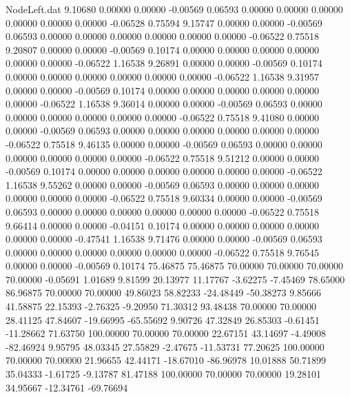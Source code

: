 \begin{filecontents}{NodeLeft.dat}
   9.10680    0.00000    0.00000    -0.00569    0.06593    0.00000    0.00000    0.00000    0.00000    0.00000    0.00000   -0.06528    0.75594
   9.15747    0.00000    0.00000    -0.00569    0.06593    0.00000    0.00000    0.00000    0.00000    0.00000    0.00000   -0.06522    0.75518
   9.20807    0.00000    0.00000    -0.00569    0.10174    0.00000    0.00000    0.00000    0.00000    0.00000    0.00000   -0.06522    1.16538
   9.26891    0.00000    0.00000    -0.00569    0.10174    0.00000    0.00000    0.00000    0.00000    0.00000    0.00000   -0.06522    1.16538
   9.31957    0.00000    0.00000    -0.00569    0.10174    0.00000    0.00000    0.00000    0.00000    0.00000    0.00000   -0.06522    1.16538
   9.36014    0.00000    0.00000    -0.00569    0.06593    0.00000    0.00000    0.00000    0.00000    0.00000    0.00000   -0.06522    0.75518
   9.41080    0.00000    0.00000    -0.00569    0.06593    0.00000    0.00000    0.00000    0.00000    0.00000    0.00000   -0.06522    0.75518
   9.46135    0.00000    0.00000    -0.00569    0.06593    0.00000    0.00000    0.00000    0.00000    0.00000    0.00000   -0.06522    0.75518
   9.51212    0.00000    0.00000    -0.00569    0.10174    0.00000    0.00000    0.00000    0.00000    0.00000    0.00000   -0.06522    1.16538
   9.55262    0.00000    0.00000    -0.00569    0.06593    0.00000    0.00000    0.00000    0.00000    0.00000    0.00000   -0.06522    0.75518
   9.60334    0.00000    0.00000    -0.00569    0.06593    0.00000    0.00000    0.00000    0.00000    0.00000    0.00000   -0.06522    0.75518
   9.66414    0.00000    0.00000    -0.04151    0.10174    0.00000    0.00000    0.00000    0.00000    0.00000    0.00000   -0.47541    1.16538
   9.71476    0.00000    0.00000    -0.00569    0.06593    0.00000    0.00000    0.00000    0.00000    0.00000    0.00000   -0.06522    0.75518
   9.76545    0.00000    0.00000    -0.00569    0.10174   75.46875   75.46875   70.00000   70.00000   70.00000   70.00000   -0.05691    1.01689
   9.81599   20.13977   11.17767    -3.62275   -7.45469   78.65000   86.96875   70.00000   70.00000   49.86023   58.82233  -24.48449  -50.38273
   9.85666   41.58875   22.15393    -2.76325   -9.20950   71.30312   93.48438   70.00000   70.00000   28.41125   47.84607  -19.66995  -65.55692
   9.90726   47.32849   26.85303    -0.61451  -11.28662   71.63750  100.00000   70.00000   70.00000   22.67151   43.14697   -4.49008  -82.46924
   9.95795   48.03345   27.55829    -2.47675  -11.53731   77.20625  100.00000   70.00000   70.00000   21.96655   42.44171  -18.67010  -86.96978
  10.01888   50.71899   35.04333    -1.61725   -9.13787   81.47188  100.00000   70.00000   70.00000   19.28101   34.95667  -12.34761  -69.76694

\end{filecontents}
